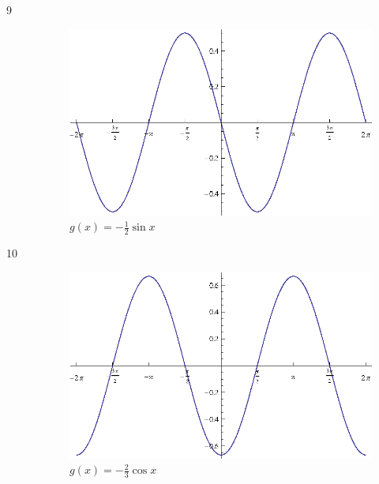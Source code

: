 \documentclass{exam}
\begin{document}
\begin{description}
      \item[9]
        \begin{figure}[H]
          \centering
          \includegraphics[scale=0.9]{exercise09.eps}
          \caption{$g(x) = - \frac{1}{2} \sin x$}
        \end{figure}

      \item[10]
        \begin{figure}[H]
          \centering
          \includegraphics[scale=0.9]{exercise10.eps}
          \caption{$g(x) = - \frac{2}{3} \cos x$}
        \end{figure}


\end{description}
\end{document}
